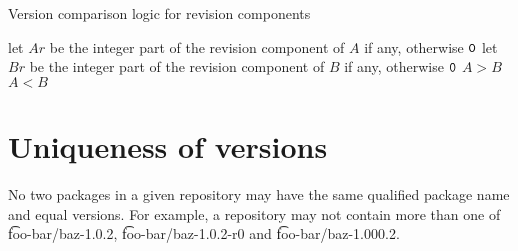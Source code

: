 \begin{algorithm}
\caption{Version comparison logic for revision components} \label{alg:version-comparison-revision}
\begin{algorithmic}[1]
  \STATE let $Ar$ be the integer part of the revision component of $A$ if any, otherwise $\texttt{0}$
  \STATE let $Br$ be the integer part of the revision component of $B$ if any, otherwise $\texttt{0}$
    \RETURN $A>B$
    \RETURN $A<B$
  \ENDIF
\end{algorithmic}
\end{algorithm}

\section{Uniqueness of versions}

No two packages in a given repository may have the same qualified package name and equal versions.
For example, a repository may not contain more than one of \t{foo-bar/baz-1.0.2},
\t{foo-bar/baz-1.0.2-r0} and \t{foo-bar/baz-1.000.2}.


